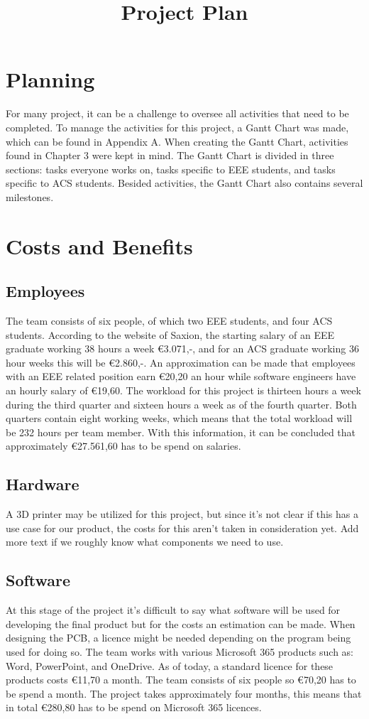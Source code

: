 \documentclass{article}
\title{Project Plan}
\begin{document}
\maketitle
\section{Planning}
For many project, it can be a challenge to oversee all activities that need to be completed. 
To manage the activities for this project, a Gantt Chart was made, which can be found in Appendix A.
When creating the Gantt Chart, activities found in Chapter 3 were kept in mind.
The Gantt Chart is divided in three sections: tasks everyone works on, tasks specific to EEE students, and tasks specific to ACS students.
Besided activities, the Gantt Chart also contains several milestones.

\section{Costs and Benefits}
\subsection*{Employees}
The team consists of six people, of which two EEE students, and four ACS students.
According to the website of Saxion, the starting salary of an EEE graduate working 38 hours a week \euro{}3.071,-, and for an ACS graduate working 36 hour weeks this will be \euro{}2.860,-.
An approximation can be made that employees with an EEE related position earn \euro{}20,20 an hour while software engineers have an hourly salary of \euro{}19,60.
The workload for this project is thirteen hours a week during the third quarter and sixteen hours a week as of the fourth quarter.
Both quarters contain eight working weeks, which means that the total workload will be 232 hours per team member.
With this information, it can be concluded that approximately \euro{}27.561,60 has to be spend on salaries.

\subsection*{Hardware}
A 3D printer may be utilized for this project, but since it's not clear if this has a use case for our product, the costs for this aren't taken in consideration yet.
Add more text if we roughly know what components we need to use.

\subsection*{Software}
At this stage of the project it's difficult to say what software will be used for developing the final product but for the costs an estimation can be made.
When designing the PCB, a licence might be needed depending on the program being used for doing so.
The team works with various Microsoft 365 products such as: Word, PowerPoint, and OneDrive.
As of today, a standard licence for these products costs \euro{}11,70 a month. 
The team consists of six people so \textup{\euro}70,20 has to be spend a month.
The project takes approximately four months, this means that in total \euro{}280,80 has to be spend on Microsoft 365 licences.
\end{document}
